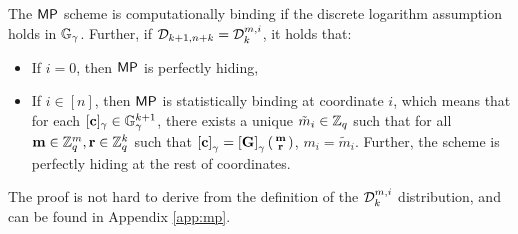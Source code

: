 \begin{theorem} \label{theo:mp} The $\mathsf{MP}$ scheme is computationally binding if  the discrete logarithm assumption holds in $\mathbb{G}_\gamma$. Further, if 
$\mathcal{D}_{k+1,n+k}=\mathcal{D}_k^{m,i}$, it holds that: 
\begin{itemize}
\item If $i=0$,  then $\mathsf{MP}$ is perfectly hiding,
\item If $i \in [n]$, then $\mathsf{MP}$ is statistically binding at coordinate $i$, which means that for each $[\mathbf{c}]_\gamma \in \mathbb{G}_{\gamma}^{k+1}$,
there exists a unique $\tilde{m}_i \in\mathbb{Z}_q$ such that for all $\mathbf{m} \in\mathbb{Z}_q^m, \mathbf{r} \in\mathbb{Z}_q^{k}$ such that  $\left[\mathbf{c}\right]_{\gamma}=\left[\mathbf{{G}}\right]_{\gamma}\left(\begin{smallmatrix}\mathbf{m}\\\mathbf{r}\end{smallmatrix}\right)$, $m_i=\tilde{m}_i$. Further, the scheme is perfectly hiding at the rest of coordinates. 
\end{itemize}
\end{theorem}
The proof is not hard to derive from the definition of the $\mathcal{D}_k^{m,i}$ distribution, and can be found in Appendix \ref{app:mp}. 


